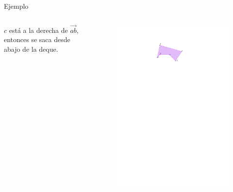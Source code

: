 \documentclass[aspectratio=169,xcolor=dvipsnames, t]{beamer}
\begin{document}
\begin{frame}{Ejemplo}
  \begin{columns}
    \begin{column}{0.5\textwidth}
      $c$ está a la derecha de $\overrightarrow{ab}$, entonces se saca desde abajo de la deque.
    \end{column}
    \begin{column}{0.5\textwidth}
      \begin{figure}
        \centering
        \includegraphics[width=\linewidth, height=0.5\textheight, page=4, keepaspectratio]{IPE/Melkman.pdf}
      \end{figure}
    \end{column}
  \end{columns}
\end{frame}
\end{document}
